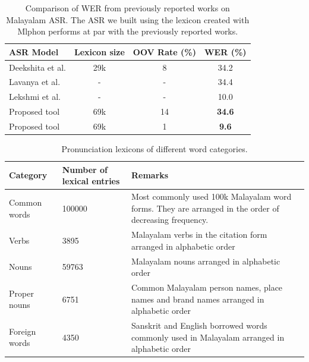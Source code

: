 \documentclass{ieeeaccess}
\begin{document}
\begin{table}[h]
	\caption{Comparison of WER from previously reported works on  Malayalam ASR. The ASR we built using the lexicon created with Mlphon performs at par with the previously reported works.}
	\label{asrcomparison}
	\begin{tabular}{lcc|c}
 \hline \hline
 \textbf{ASR Model} & \textbf{Lexicon size} & \textbf{OOV Rate (\%)}& \textbf{WER (\%)} \\
 \hline
 Deekshita et al.\cite{deekshitha} & 29k & 8 & 34.2 \\
 Lavanya et al. \cite{lavanya2018} & - & - & 34.4 \\
Lekshmi et al. \cite{lekshmi2021} & - & - & 10.0 \\
Proposed tool & 69k & 14& \textbf{34.6} \\
Proposed tool & 69k & 1& \textbf{9.6}\\

\hline	\end{tabular}
\end{table}


\begin{table}[ht]
\centering
	\begin{center}
		\begin{minipage}{\textwidth}
			\caption{Pronunciation lexicons of different word categories.}
			\label{dictionaries}
			\begin{tabular}{@{}p{1.8cm}p{3cm}p{12cm}@{}}
				\hline
				\hline
				\textbf{Category} & \textbf{Number of lexical entries} & \textbf{Remarks}                                                                                                   \\
				\hline
				Common words      & 100000                             & Most commonly used 100k Malayalam word forms. They are arranged in the order of decreasing frequency. \\
				Verbs             & 3895                               & Malayalam verbs in the citation form arranged in alphabetic order                                                  \\
				Nouns             & 59763                              & Malayalam nouns arranged in alphabetic order                                                                       \\
				Proper nouns      & 6751                               & Common Malayalam person names, place names and brand names arranged in alphabetic order                            \\
				Foreign words     & 4350                               & Sanskrit and English borrowed words commonly used in Malayalam arranged in alphabetic order                        \\

				\hline
			\end{tabular}
		\end{minipage}
	\end{center}
\end{table}
\end{document}
